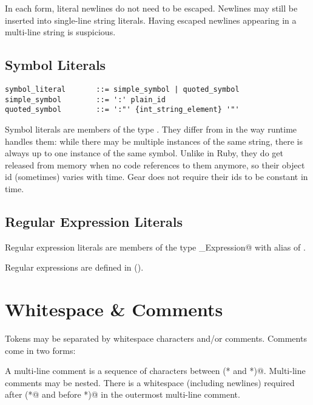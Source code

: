 In each form, literal newlines do not need to be escaped. Newlines may still be inserted into single-line string literals. Having escaped newlines appearing in a multi-line string is suspicious. 





\subsection{Symbol Literals}
\label{sec:symbolliterals}

\syntax\begin{lstlisting}
symbol_literal       ::= simple_symbol | quoted_symbol
simple_symbol        ::= ':' plain_id
quoted_symbol        ::= ':"' {int_string_element} '"'
\end{lstlisting}

Symbol literals are members of the type \lstinline@Symbol@. They differ from  in the way runtime handles them: while there may be multiple instances of the same string, there is always up to one instance of the same symbol. Unlike in Ruby, they do get released from memory when no code references to them anymore, so their object id (sometimes) varies with time. Gear does not require their ids to be constant in time. 









\subsection{Regular Expression Literals}
\label{sec:regexpliterals}

Regular expression literals are members of the type \lstinline@Regular_Expression@ with alias of \lstinline@Regexp@. 

Regular expressions are defined in (). 





\section{Whitespace \& Comments}
\label{sec:whitespacecomments}

Tokens may be separated by whitespace characters and/or comments. Comments come in two forms: 

A multi-line comment is a sequence of characters between \lstinline@(* and *)@. Multi-line comments may be nested. There is a whitespace (including newlines) required after \lstinline@(*@ and before \lstinline@*)@ in the outermost multi-line comment. 

